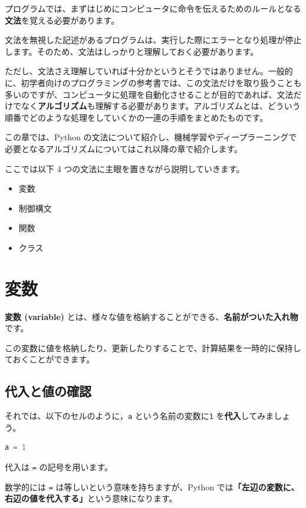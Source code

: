 プログラムでは、まずはじめにコンピュータに命令を伝えるためのルールとなる\textbf{文法}を覚える必要があります。

文法を無視した記述があるプログラムは、実行した際にエラーとなり処理が停止します。そのため、文法はしっかりと理解しておく必要があります。


ただし、文法さえ理解していれば十分かというとそうではありません。一般的に、初学者向けのプログラミングの参考書では、この文法だけを取り扱うことも多いのですが、コンピュータに処理を自動化させることが目的であれば、文法だけでなく\textbf{アルゴリズム}も理解する必要があります。アルゴリズムとは、どういう順番でどのような処理をしていくかの一連の手順をまとめたものです。


この章では、Python の文法について紹介し、機械学習やディープラーニングで必要となるアルゴリズムについてはこれ以降の章で紹介します。


ここでは以下 4 つの文法に主眼を置きながら説明していきます。


\begin{itemize}
\item 変数
\item 制御構文
\item 関数
\item クラス
\end{itemize}


\section{変数}


\textbf{変数 (variable)} とは、様々な値を格納することができる、\textbf{名前がついた入れ物}です。

この変数に値を格納したり、更新したりすることで、計算結果を一時的に保持しておくことができます。


\subsection{代入と値の確認}


それでは、以下のセルのように，\texttt{a} という名前の変数に\texttt{1} を\textbf{代入}してみましょう。


\begin{lstlisting}[style=codecell,language=Python]
a = 1
\end{lstlisting}

代入は \texttt{=} の記号を用います。

数学的には \texttt{=} は等しいという意味を持ちますが、Python では\textbf{「左辺の変数に、右辺の値を代入する」}という意味になります。

